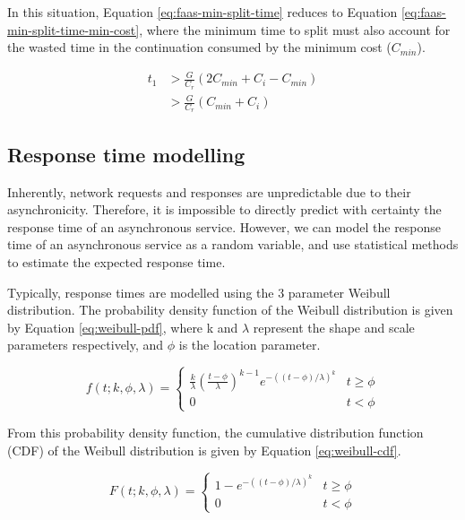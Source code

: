In this situation, Equation \ref{eq:faas-min-split-time} reduces to Equation \ref{eq:faas-min-split-time-min-cost}, where the minimum time to split must also account for the wasted time in the continuation consumed by the minimum cost ($C_{min}$).

\begin{equation} \label{eq:faas-min-split-time-min-cost}
\begin{aligned}
t_1 & > \frac{G}{C_r} \left( 2 C_{min} + C_i - C_{min} \right) \\
    & > \frac{G}{C_r} \left( C_{min} + C_i \right)
\end{aligned}
\end{equation}

\subsection{Response time modelling}
Inherently, network requests and responses are unpredictable due to their asynchronicity. Therefore, it is impossible to directly predict with certainty the response time of an asynchronous service. However, we can model the response time of an asynchronous service as a random variable, and use statistical methods to estimate the expected response time.

Typically, response times are modelled using the 3 parameter Weibull distribution\cite{rouderHierarchicalModelEstimating2005}. The probability density function of the Weibull distribution is given by Equation \ref{eq:weibull-pdf}, where k and $\lambda$ represent the shape and scale parameters respectively, and $\phi$ is the location parameter.

\begin{equation} \label{eq:weibull-pdf}
f(t; k, \phi, \lambda) =
\begin{cases}
\frac{k}{\lambda} \left(\frac{t - \phi}{\lambda}\right)^{k-1} e^{-((t - \phi)/\lambda)^k} & t \geq \phi \\
0 & t < \phi
\end{cases}
\end{equation}

From this probability density function, the cumulative distribution function (CDF) of the Weibull distribution is given by Equation \ref{eq:weibull-cdf}.

\begin{equation} \label{eq:weibull-cdf}
F(t; k, \phi, \lambda) =
\begin{cases}
1 - e^{-((t - \phi)/\lambda)^k} & t \geq \phi \\
0 & t < \phi
\end{cases}
\end{equation}

